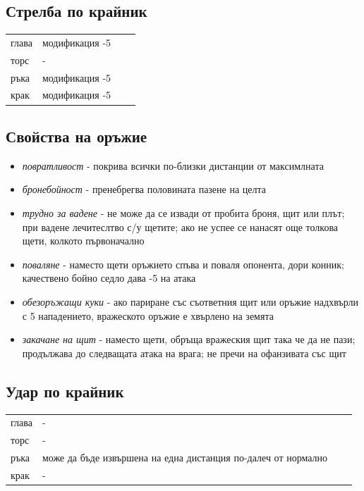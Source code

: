 \subsection{Стрелба по крайник}
\begin{tabular}{l | l | l | l }
глава & модификация -5  \\
торс  & -  \\
ръка & модификация -5  \\
крак & модификация -5  \\
\end{tabular}


\subsection{Свойства на оръжие}
\begin{itemize}
\item{\textit{повратливост} - покрива всички по-близки дистанции от максимлната}
\item{\textit{бронебойност} - пренебрегва половината пазене на целта}
\item{\textit{трудно за вадене} - не може да се извади от пробита броня, щит или плът; при вадене лечитеслтво с/у щетите; ако не успее се  нанасят още толкова щети, колкото първоначално}
\item{\textit{поваляне} - наместо щети оръжието спъва и поваля опонента, дори конник; качествено бойно седло дава -5 на атака}
\item{\textit{обезоръжащи куки} - ако париране със съответния щит или оръжие надхвърли с 5 нападението, вражеското оръжие е хвърлено на земята}
\item{\textit{закачане на щит} - наместо щети, обръща вражеския щит така че да не пази; продължава до следващата атака на врага; не пречи на офанзивата със щит}
\end{itemize}


\subsection{Удар по крайник}
\begin{tabular}{l | l | l | l }
глава & -  \\
торс  & -  \\
ръка  & може да бъде извършена на една дистанция по-далеч от нормално  \\
крак  & -  \\
\end{tabular}


